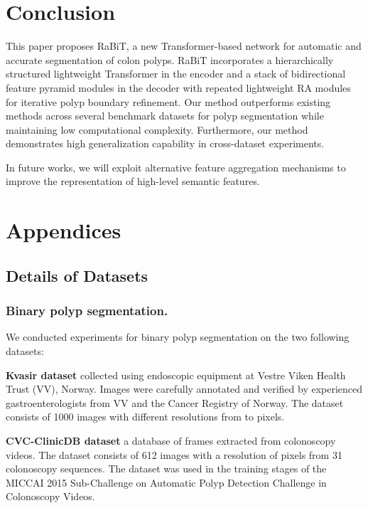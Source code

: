 \documentclass{article}
\begin{document}
\section{Conclusion}
\label{sec:conclude}
This paper proposes RaBiT, a new Transformer-based network for automatic and accurate segmentation of colon polyps. RaBiT incorporates a hierarchically structured lightweight Transformer in the encoder and a stack of bidirectional feature pyramid modules in the decoder with repeated lightweight RA modules for iterative polyp boundary refinement. Our method outperforms existing methods across several benchmark datasets for polyp segmentation while maintaining low computational complexity. Furthermore, our method demonstrates high generalization capability in cross-dataset experiments.

In future works, we will exploit alternative feature aggregation mechanisms to improve the representation of high-level semantic features.











\section{Appendices}

\subsection{Details of Datasets}
\subsubsection{Binary polyp segmentation.} 
We conducted experiments for binary polyp segmentation on the two following datasets:

\textbf{Kvasir dataset} \cite{kvasir} collected using endoscopic equipment at Vestre Viken Health Trust (VV), Norway. Images were carefully annotated and verified by experienced gastroenterologists from VV and the Cancer Registry of Norway. The dataset consists of 1000 images with different resolutions from  to  pixels.

\textbf{CVC-ClinicDB dataset} \cite{cvc_clinic} a database of frames extracted from colonoscopy videos. The dataset consists of 612 images with a resolution of  pixels from 31 colonoscopy sequences. The dataset was used in the training stages of the MICCAI 2015 Sub-Challenge on Automatic Polyp Detection Challenge in Colonoscopy Videos.
\end{document}
